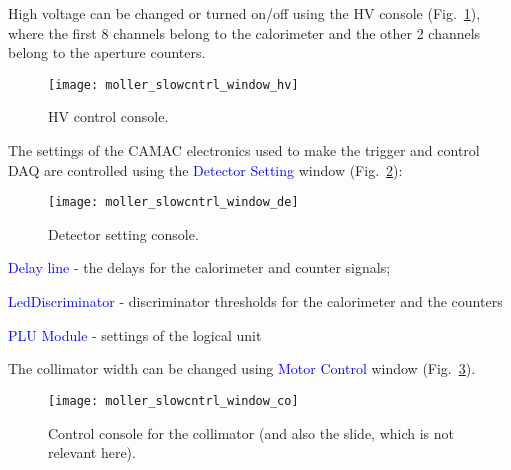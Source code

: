 {{  High voltage can be changed or turned on/off using the HV console (Fig.~\ref{fig:moller_slowc_hv}),
  where the first 8 channels belong to the calorimeter and the other 2 channels
  belong to the aperture counters.
   \begin{figure}[htb]
      \begin{center}
          \texttt{[image: moller\_slowcntrl\_window\_hv]}
      \end{center}
      \caption[M{\o}ller:HV control]{HV control console.
            }
      \label{fig:moller_slowc_hv} 
   \end{figure}  
  The settings of the CAMAC electronics used to make the trigger
  and control DAQ are controlled using the \textcolor{blue}{Detector Setting} window (Fig.~\ref{fig:moller_slowc_de}):
   \begin{figure}[htb]
      \begin{center}
          \texttt{[image: moller\_slowcntrl\_window\_de]}
      \end{center}
      \caption[M{\o}ller: electronics control]{Detector setting console.
            }
      \label{fig:moller_slowc_de} 
   \end{figure}  
   \begin{list}{--}{\setlength{\itemsep}{-0.15cm}}
     \item \textcolor{blue}{Delay line} - the delays for the calorimeter and counter signals;
     \item \textcolor{blue}{LedDiscriminator} - discriminator thresholds for the calorimeter and the counters
     \item \textcolor{blue}{PLU Module} - settings of the logical unit
   \end{list}
  The collimator width can be changed using
  \textcolor{blue}{Motor Control} window (Fig.~\ref{fig:moller_slowc_co}).
   \begin{figure}[htb]
      \begin{center}
          \texttt{[image: moller\_slowcntrl\_window\_co]}
      \end{center}
      \caption[M{\o}ller: collimator control]{Control console for the collimator 
               (and also the slide, which is not relevant here).
            }
      \label{fig:moller_slowc_co} 
   \end{figure}  
}

}

